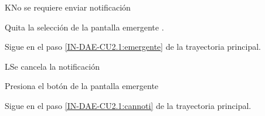 
\begin{UCtrayectoriaA}{K}{No se requiere enviar notificación}
	
	\UCpaso [\UCactor] 	Quita la selección \IUCheck de la pantalla emergente  .
	
	\UCpaso Sigue en el paso \ref{IN-DAE-CU2.1:emergente}  de la trayectoria principal.
\end{UCtrayectoriaA}


\begin{UCtrayectoriaA}{L}{Se cancela la notificación }
	
	\UCpaso [\UCactor] Presiona el botón  de la pantalla emergente 
	
	\UCpaso Sigue en el paso \ref{IN-DAE-CU2.1:cannoti}  de la trayectoria principal.
\end{UCtrayectoriaA}

